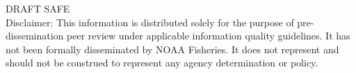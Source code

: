 \begin{center}
\vfill
DRAFT SAFE\\
Disclaimer: This information is distributed solely for the purpose of pre-dissemination
peer review under applicable information quality guidelines. It has not been formally
disseminated by NOAA Fisheries. It does not represent and should not be construed to
represent any agency determination or policy. 

\vspace{.3cm}


\newpage{\thispagestyle{empty}}


% 

\maketitle

\setcounter{page}{1}
\end{center}


